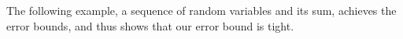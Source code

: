 \documentclass[review]{elsarticle}
\newtheorem{example}{Example}
\begin{document}
%
%
The following example, a sequence of random variables and its sum,
achieves the error bounds, and thus
shows that our error bound is tight.
\end{document}
